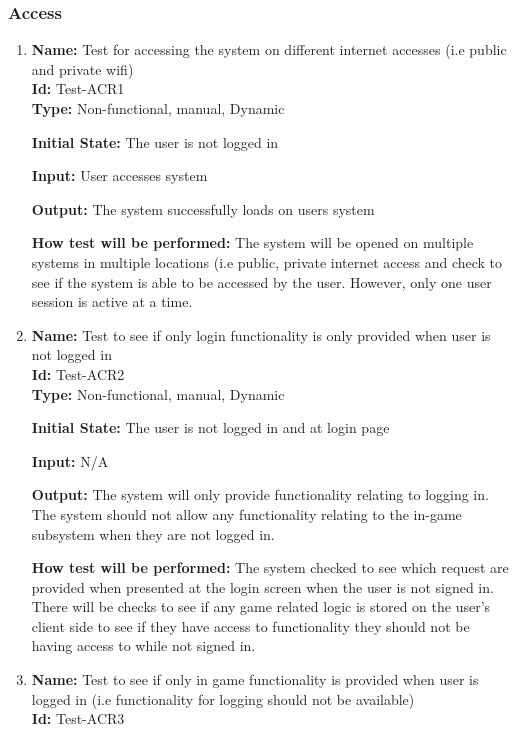 \documentclass[12pt, titlepage]{article}
\begin{document}
\subsubsection{Access}
\begin{enumerate}
    \item{\textbf{Name:} Test for accessing the system on different internet accesses (i.e public and private wifi)\\} \label{Test-ACR1}
    \textbf{Id:} Test-ACR1\\
    
    \textbf{Type:} Non-functional, manual, Dynamic
    					
    \textbf{Initial State:} The user is not logged in
    					
    \textbf{Input:} User accesses system
    					
    \textbf{Output:} The system successfully loads on users system
    					
    \textbf{How test will be performed:} The system will be opened on multiple systems in multiple locations (i.e public, private internet access and check to see if the system is able to be accessed by the user. However, only one user session is active at a time.
    
    \item{\textbf{Name:} Test to see if only login functionality is only provided when user is not logged in\\} \label{Test-ACR2}
    \textbf{Id:} Test-ACR2\\
    
    \textbf{Type:} Non-functional, manual, Dynamic
    					
    \textbf{Initial State:} The user is not logged in and at login page
    					
    \textbf{Input:} N/A
    					
    \textbf{Output:} The system will only provide functionality relating to logging in. The system should not allow any functionality relating to the in-game subsystem when they are not logged in.
    					
    \textbf{How test will be performed:} The system checked to see which request are provided when presented at the login screen when the user is not signed in. There will be checks to see if any game related logic is stored on the user's client side to see if they have access to functionality they should not be having access to while not signed in. 
    
    \item{\textbf{Name:} Test to see if only in game functionality is provided when user is logged in (i.e functionality for logging should not be available)\\} \label{Test-ACR3}
    \textbf{Id: }Test-ACR3\\
    

\end{enumerate}
\end{document}
